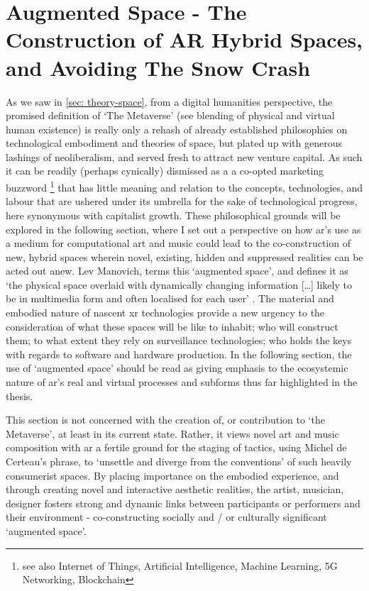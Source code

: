 \section[Augmented Space]{Augmented Space - The Construction of AR Hybrid Spaces, and Avoiding The Snow Crash}\label{sec: discussion-medium-space}
As we saw in \autoref{sec: theory-space}, from a digital humanities perspective, the promised definition of `The Metaverse' (see blending of physical and virtual human existence) is really only a rehash of already established philosophies on technological embodiment and theories of space, but plated up with generous lashings of neoliberalism, and served fresh to attract new venture capital. As such it can be readily (perhaps cynically) dismissed as a a co-opted marketing buzzword \footnote{see also Internet of Things, Artificial Intelligence, Machine Learning, 5G Networking, Blockchain} that has little meaning and relation to the concepts, technologies, and labour that are ushered under its umbrella for the sake of technological progress, here synonymous with capitalist growth. These philosophical grounds will be explored in the following section, where I set out a perspective on how \gls{ar}'s use as a medium for computational art and music could lead to the co-construction of new, hybrid spaces wherein novel, existing, hidden and suppressed realities can be acted out anew. Lev Manovich, terms this `augmented space', and defines it as `the physical space overlaid with dynamically changing information […] likely to be in multimedia form and often localised for each user' \citep[p. 2]{manovich2006}. The material and embodied nature of nascent \gls{xr} technologies provide a new urgency to the consideration of what these spaces will be like to inhabit; who will construct them; to what extent they rely on surveillance technologies; who holds the keys with regards to software and hardware production. In the following section, the use of `augmented space' should be read as giving emphasis to the ecosystemic nature of \gls{ar}'s real and virtual processes and subforms thus far highlighted in the thesis. 

This section is not concerned with the creation of, or contribution to `the Metaverse', at least in its current state. Rather, it views novel art and music composition with \gls{ar} a fertile ground for the staging of tactics, using Michel de Certeau's phrase, to `unsettle and diverge from the conventions' \citeyearpar[p. 36]{decerteau1984} of such heavily consumerist spaces. By placing importance on the embodied experience, and through creating novel and interactive aesthetic realities, the artist, musician, designer fosters strong and dynamic links between participants or performers and their environment - co-constructing socially and / or culturally significant `augmented space'.


